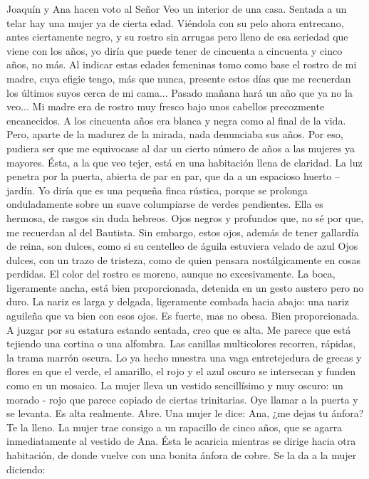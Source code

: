 \documentclass[12pt]{book} %
\begin{document}
Joaquín y Ana hacen voto al Señor 
Veo un interior de una casa. Sentada a un telar hay una mujer ya de cierta edad. Viéndola con su pelo ahora entrecano, antes ciertamente negro, y su rostro sin arrugas pero lleno de esa seriedad que viene con los años, yo diría que puede tener de cincuenta a cincuenta y cinco años, no más. 
 Al indicar estas edades femeninas tomo como base el rostro de mi madre, cuya efigie tengo, más que nunca, presente estos días que me recuerdan los últimos suyos cerca de mi cama... Pasado mañana hará un año que ya no la veo... Mi madre era de rostro muy fresco bajo unos cabellos precozmente encanecidos. A los cincuenta años era blanca y negra como al final de la vida. Pero, aparte de la madurez de la mirada, nada denunciaba sus años. Por eso, pudiera ser que me equivocase al dar un cierto número de años a las mujeres ya mayores. 
Ésta, a la que veo tejer, está en una habitación llena de claridad. La luz penetra por la puerta, abierta de par en par, que 
da a un espacioso huerto – jardín. Yo diría que es una pequeña finca rústica, porque se prolonga onduladamente sobre un suave columpiarse de verdes pendientes. Ella es hermosa, de rasgos sin duda hebreos. Ojos negros y profundos que, no sé por que, me recuerdan al del Bautista. Sin embargo, estos ojos, además de tener gallardía de reina, son dulces, como si su centelleo de águila estuviera velado de azul Ojos dulces, con un trazo de tristeza, como de quien pensara nostálgicamente en cosas perdidas. El color del rostro es moreno, aunque no excesivamente. La boca, ligeramente ancha, está bien proporcionada, detenida en un gesto austero pero no duro. La nariz es larga y delgada, ligeramente combada hacia abajo: una nariz aguileña que va bien con esos ojos. Es fuerte, mas no obesa. Bien proporcionada. A juzgar por su estatura estando sentada, creo que es alta. 
Me parece que está tejiendo una cortina o una alfombra. Las canillas multicolores recorren, rápidas, la trama marrón 
oscura. Lo ya hecho muestra una vaga entretejedura de grecas y flores en que el verde, el amarillo, el rojo y el azul oscuro se intersecan y funden como en un mosaico. La mujer lleva un vestido sencillísimo y muy oscuro: un morado - rojo que parece copiado de ciertas trinitarias. 
Oye llamar a la puerta y se levanta. Es alta realmente. Abre. 
Una mujer le dice: 
Ana, ¿me dejas tu ánfora? Te la lleno. 
La mujer trae consigo a un rapacillo de cinco años, que se agarra inmediatamente al vestido de Ana. Ésta le acaricia 
mientras se dirige hacia otra habitación, de donde vuelve con una bonita ánfora de cobre. Se la da a la mujer diciendo: 
\end{document}
